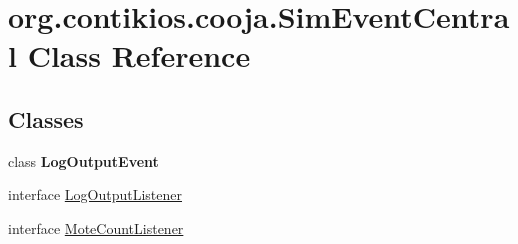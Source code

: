 \hypertarget{classorg_1_1contikios_1_1cooja_1_1SimEventCentral}{\section{org.\-contikios.\-cooja.\-Sim\-Event\-Central Class Reference}
\label{classorg_1_1contikios_1_1cooja_1_1SimEventCentral}
}
\subsection*{Classes}
\begin{DoxyCompactItemize}
\item 
class {\bfseries Log\-Output\-Event}
\item 
interface \hyperlink{interfaceorg_1_1contikios_1_1cooja_1_1SimEventCentral_1_1LogOutputListener}{Log\-Output\-Listener}
\item 
interface \hyperlink{interfaceorg_1_1contikios_1_1cooja_1_1SimEventCentral_1_1MoteCountListener}{Mote\-Count\-Listener}
\end{DoxyCompactItemize}
